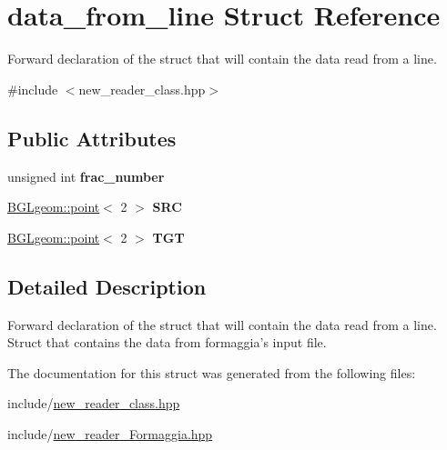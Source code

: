\hypertarget{structdata__from__line}{
\section{data\_\-from\_\-line Struct Reference}
\label{structdata__from__line}
}


Forward declaration of the struct that will contain the data read from a line.  


{\ttfamily \#include $<$new\_\-reader\_\-class.hpp$>$}\subsection*{Public Attributes}
\begin{DoxyCompactItemize}
\item 
\hypertarget{structdata__from__line_a07f0c042bbd429013dadb9fe711e29d0}{
unsigned int {\bfseries frac\_\-number}}
\label{structdata__from__line_a07f0c042bbd429013dadb9fe711e29d0}

\item 
\hypertarget{structdata__from__line_ac83eaf04ef168ce99470a1080dfb277d}{
\hyperlink{classBGLgeom_1_1point}{BGLgeom::point}$<$ 2 $>$ {\bfseries SRC}}
\label{structdata__from__line_ac83eaf04ef168ce99470a1080dfb277d}

\item 
\hypertarget{structdata__from__line_aed490cd15dc2dc9d90fda08c9e4e589e}{
\hyperlink{classBGLgeom_1_1point}{BGLgeom::point}$<$ 2 $>$ {\bfseries TGT}}
\label{structdata__from__line_aed490cd15dc2dc9d90fda08c9e4e589e}

\end{DoxyCompactItemize}


\subsection{Detailed Description}
Forward declaration of the struct that will contain the data read from a line. Struct that contains the data from formaggia's input file. 

The documentation for this struct was generated from the following files:\begin{DoxyCompactItemize}
\item 
include/\hyperlink{new__reader__class_8hpp}{new\_\-reader\_\-class.hpp}\item 
include/\hyperlink{new__reader__Formaggia_8hpp}{new\_\-reader\_\-Formaggia.hpp}\end{DoxyCompactItemize}
